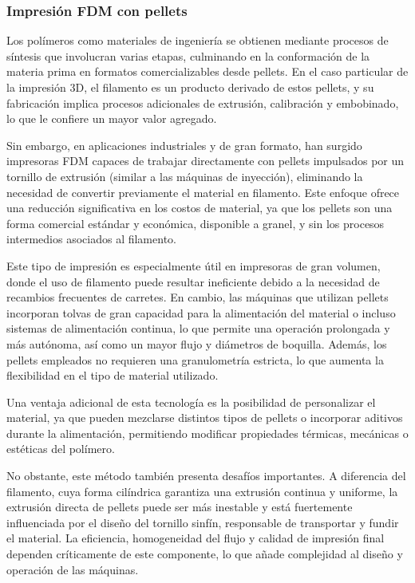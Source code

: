 \subsubsection{Impresión FDM con pellets}

Los polímeros como materiales de ingeniería se obtienen mediante procesos de síntesis que involucran varias etapas, culminando en la conformación de la materia prima en formatos comercializables desde pellets. En el caso particular de la impresión 3D, el filamento es un producto derivado de estos pellets, y su fabricación implica procesos adicionales de extrusión, calibración y embobinado, lo que le confiere un mayor valor agregado.

Sin embargo, en aplicaciones industriales y de gran formato, han surgido impresoras FDM capaces de trabajar directamente con pellets impulsados por un tornillo de extrusión (similar a las máquinas de inyección), eliminando la necesidad de convertir previamente el material en filamento. Este enfoque ofrece una reducción significativa en los costos de material, ya que los pellets son una forma comercial estándar y económica, disponible a granel, y sin los procesos intermedios asociados al filamento.

Este tipo de impresión es especialmente útil en impresoras de gran volumen, donde el uso de filamento puede resultar ineficiente debido a la necesidad de recambios frecuentes de carretes. En cambio, las máquinas que utilizan pellets incorporan tolvas de gran capacidad para la alimentación del material o incluso sistemas de alimentación continua, lo que permite una operación prolongada y más autónoma, así como un mayor flujo y diámetros de boquilla. Además, los pellets empleados no requieren una granulometría estricta, lo que aumenta la flexibilidad en el tipo de material utilizado.

Una ventaja adicional de esta tecnología es la posibilidad de personalizar el material, ya que pueden mezclarse distintos tipos de pellets o incorporar aditivos durante la alimentación, permitiendo modificar propiedades térmicas, mecánicas o estéticas del polímero.  

No obstante, este método también presenta desafíos importantes. A diferencia del filamento, cuya forma cilíndrica garantiza una extrusión continua y uniforme, la extrusión directa de pellets puede ser más inestable y está fuertemente influenciada por el diseño del tornillo sinfín, responsable de transportar y fundir el material. La eficiencia, homogeneidad del flujo y calidad de impresión final dependen críticamente de este componente, lo que añade complejidad al diseño y operación de las máquinas.

